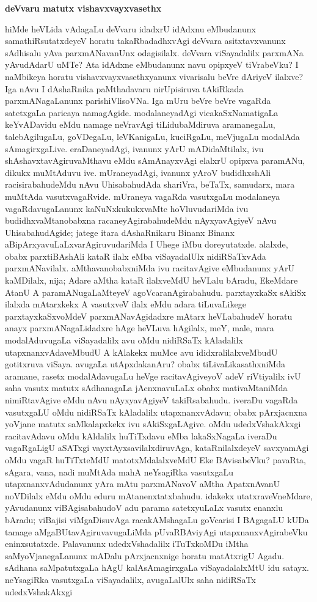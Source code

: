 \bigskip
\begin{center}
{\Large\bf deVvaru matutx vishavxvayxvasethx}
\end{center}

hiMde heVLida vAdagaLu deVvaru idadxrU idAdxnu eMbudanunx samathiRsu\-tatx\-deyeV horatu takaRbadadhxvAgi deVvara asitxtavxvanunx sAdhisalu yAva parxmANavanUnx odagisilalx. deVvara viSayadalilx parxmANa yAvudAdarU uMTe? Ata idAdxne eMbu\-danunx navu opipxyeV tiVrabeVku? I naMbikeya horatu vishavxvayxvasethxyanunx vivarisalu beVre dAriyeV ilalxve? Iga nAvu I dAshaRnika paMthadavaru nirUpisiruva tAkiRkada parxmANagaLanunx parishiVlisoVNa. Iga mUru beVre beVre vagaRda satetxgaLa paricaya namagAgide. modalaneyadAgi vicakaSxNamatigaLa keYvADavidu eMdu namage neVravAgi tiLidubaMdiruva aramanegaLu, talebAgilugaLu, goVDegaLu, leVKanigaLu, kuciRgaLu, meVjugaLu modalAda sAmagirxgaLive. eraDaneyadAgi, ivanunx yArU mADidaMtilalx, ivu shAshavxtavAgiruvaMthavu eMdu sAmAnayxvAgi elalxrU opipxva paramANu, dikukx muMtAduvu ive. mUraneyadAgi, ivanunx yAroV budidhxshAli racisirabahudeMdu nAvu UhisabahudAda shariVra, beTaTx, samudarx, mara muMtAda vasutxvagaRvide. mUraneya vagaRda vasutxgaLu modalaneya vagaRdavugaLanunx kaNuNxkukukxvaMte hoVluvudariMda ivu budidhxvaMtanobabxna racaneyAgirabahudeMdu nAyxyavAgiyeV nAvu UhisabahudAgide; jatege itara dAshaRnikaru Binanx Binanx aBipArxyavuLaLxvarAgiruvudariMda I Uhege iMbu doreyutatxde. alalxde, obabx parxtiBAshAli kataR ilalx eMba viSayadalUlx nidiRSaTxvAda parxmANavilalx. aMthavanobabxniMda ivu racitavAgive eMbudanunx yArU kaMDilalx, nija; Adare aMtha kataR ilalxveMdU heVLalu bAradu, EkeMdare AtanU A paramANugaLaMteyeV agoVcaranAgirabahudu. parxtayxkaSx sAkiSx ilalxda mAtarxkekx A vasutxveV ilalx eMdu adara tiLuvaLikege parxtayxkaSxvoMdeV parxmANavAgidadxre mAtarx heVLabahudeV horatu anayx parxmANagaLidadxre hAge heVLuva hAgilalx, meY, male, mara modalAduvugaLa viSayadalilx avu oMdu nidiRSaTx kAladalilx utapxnanxvAdaveMbudU A kAlakekx muMce avu ididxralilalxveMbudU gotitxruva viSaya. avugaLa utApxdakanAru? obabx tiLivaLikasathxniMda aramane, rasetx modalAdavugaLu heVge racitavAgiveyoV adeV riVtiyalilx ivU saha vasutx matutx sAdhanagaLa jAcnxnavuLaLx obabx mativaMtaniMda nimiRtavAgive eMdu nAvu nAyxyavAgiyeV takiRsabahudu. iveraDu vagaRda vasutxgaLU oMdu nidiRSaTx kAladalilx utapxnanxvAdavu; obabx pArxjacnxna yoVjane matutx saMkalapxkekx ivu sAkiSxgaLAgive. oMdu udedxVshakAkxgi racitavAdavu oMdu kAldalilx huTiTxdavu eMba lakaSxNagaLa iveraDu vagaRgaLigU aSATxgi vayxtAyxsavilalxdiruvAga, kataRnilalxdeyeV savxyamAgi oMdu vagaR huTiTxteMdU matotxMdalalxveMdU Eke BAvisabeVku? pavaRta, sAgara, vana, nadi muMtAda mahA neYsagiRka vasutxgaLu utapxnanxvAdudanunx yAra mAtu parxmANavoV aMtha ApatxnAvanU noVDilalx eMdu oMdu eduru mAtanenxtatxbahudu. idakekx utatxraveVneMdare, yAvudanunx viBAgisabahudoV adu parama satetxyuLaLx vasutx enanxlu bAradu; viBajisi viMgaDisuvAga racakAMshagaLu goVcarisi I BAgagaLU kUDa tamage aMgaBUtavAgiruvavugaLiMda pUvaRBAviyAgi utapxnanxvAgirabeVku eninxsutatxde. Palavanunx udedxVshadalilx iTuTxkoMDu iMtha saMyoVjanegaLanunx mADalu pArxjacnxnige horatu matAtxrigU Agadu. sAdhana saMpatutxgaLa hAgU kalAsAmagirxgaLa viSayadalalxMtU idu satayx. neYsagiRka vasutxgaLa viSayadalilx, avugaLalUlx saha nidiRSaTx udedxVshakAkxgi 